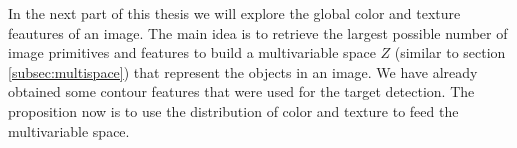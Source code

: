 In the next part of this thesis we will explore the global color and texture feautures of an image. The main idea is to retrieve the largest possible number of image primitives and features to build a multivariable space $Z$ (similar to section \ref{subsec:multispace}) that represent the objects in an image. We have already obtained some contour features that were used for the target detection. The proposition now is to use the distribution of color and texture to feed the multivariable space. 
%
